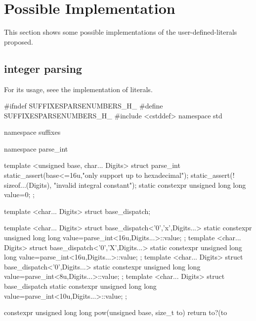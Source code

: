 \documentclass[ebook,11pt,article]{memoir}
\begin{document}
\chapter{Possible Implementation}
This section shows some possible implementations of the user-defined-literals proposed.
\section{integer parsing}
For its usage, seee the implementation of  literals.
\begin{codeblock}
#ifndef SUFFIXESPARSENUMBERS_H_
#define SUFFIXESPARSENUMBERS_H_
#include <cstddef>
namespace std {
namespace suffixes {
namespace parse_int {

template <unsigned base, char... Digits>
struct parse_int{
    static_assert(base<=16u,"only support up to hexadecimal");
    static_assert(! sizeof...(Digits), "invalid integral constant");
    static constexpr unsigned long long value=0;
};

template <char... Digits>
struct base_dispatch;

template <char... Digits>
struct base_dispatch<'0','x',Digits...>{
    static constexpr unsigned long long value=parse_int<16u,Digits...>::value;
};
template <char... Digits>
struct base_dispatch<'0','X',Digits...>{
    static constexpr unsigned long long value=parse_int<16u,Digits...>::value;
};
template <char... Digits>
struct base_dispatch<'0',Digits...>{
    static constexpr unsigned long long value=parse_int<8u,Digits...>::value;
};
template <char... Digits>
struct base_dispatch{
    static constexpr unsigned long long value=parse_int<10u,Digits...>::value;
};

constexpr unsigned long long
pow(unsigned base, size_t to) {
    return to?(to%
}

}}}
\end{codeblock}
\end{document}
